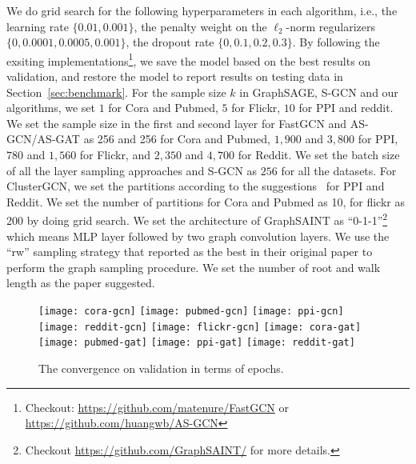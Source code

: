 \documentclass{article}
\begin{document}
We do grid search for the following hyperparameters 
in each algorithm, i.e., the learning rate $\{0.01, 0.001\}$,
the penalty weight on the $\ell_2$-norm regularizers 
$\{0, 0.0001, 0.0005, 0.001\}$,
the dropout rate $\{0, 0.1, 0.2, 0.3\}$. By following the exsiting
implementations\footnote{Checkout: 
\url{https://github.com/matenure/FastGCN} or 
\url{https://github.com/huangwb/AS-GCN}}, 
we save the model based on the best
results on validation, and restore the model to report 
results on testing data in Section~\ref{sec:benchmark}.
For the sample size $k$ in GraphSAGE, S-GCN and our algorithms, 
we set $1$ for Cora and Pubmed,
$5$ for Flickr, $10$ for PPI and reddit.
We set the sample size in the first and second layer
for FastGCN and AS-GCN/AS-GAT as 
256 and 256 for Cora and Pubmed,
$1,900$ and $3,800$ for PPI, $780$ and $1,560$
for Flickr, and $2,350$ and $4,700$ for Reddit.
We set the batch size of all the layer sampling approaches
and S-GCN as $256$ for all the datasets. For ClusterGCN, 
we set the partitions
according to the suggestions~\cite{chiang2019cluster} 
for PPI and Reddit. We set the number of partitions 
for Cora and Pubmed as 10, for flickr as 200
by doing grid search. We set the architecture of GraphSAINT as 
``0-1-1''\footnote{Checkout \url{https://github.com/GraphSAINT/} 
for more details.} which means MLP layer followed by two 
graph convolution layers. We use the ``rw'' sampling 
strategy that reported as the best in their original paper
to perform the graph sampling procedure. We set the number 
of root and walk length as the paper suggested.

\begin{figure*}[h]
\texttt{[image: cora-gcn]}
\texttt{[image: pubmed-gcn]}
\texttt{[image: ppi-gcn]}
\texttt{[image: reddit-gcn]}
\texttt{[image: flickr-gcn]}
\texttt{[image: cora-gat]}
\texttt{[image: pubmed-gat]}
\texttt{[image: ppi-gat]}
\texttt{[image: reddit-gat]}
\vspace{-0.2cm}
\caption{The convergence on validation in terms of epochs.}
\label{fig:convergence_gcn}
\end{figure*}
\vspace{-0.2cm}


\begin{comment}
\begin{figure*}[h]
\texttt{[image: cora-gat]}
\texttt{[image: pubmed-gat]}
\texttt{[image: ppi-gat]}
\texttt{[image: reddit-gat]}
\texttt{[image: flickr-gat]}
\vspace{-0.2cm}
\caption{The convergence on validation in terms of epochs.}
\label{fig:convergence_gat}
\end{figure*}
\vspace{-0.2cm}
\end{comment}
\end{document}
